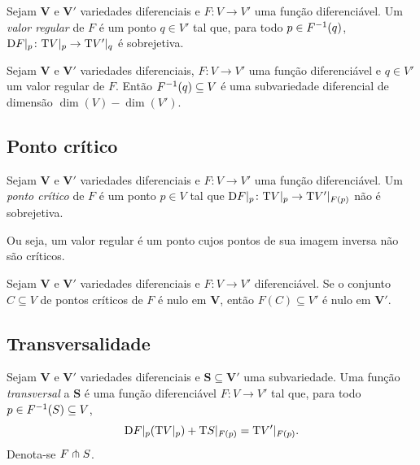 \begin{definition}
Sejam $\bm V$ e $\bm V'$ variedades diferenciais e $F\colon V \to V'$ uma função diferenciável. Um \emph{valor regular} de $F$ é um ponto $q \in V'$ tal que, para todo $p \in F^{-1}(q)$, $\mathrm{D} F|_p\colon \mathrm{T} V|_p \to \mathrm{T} V'|_q$ é  sobrejetiva.
\end{definition}

\begin{proposition}
Sejam $\bm V$ e $\bm V'$ variedades diferenciais, $F\colon V \to V'$ uma função diferenciável e $q \in V'$ um valor regular de $F$. Então $F^{-1}(q) \subseteq V$ é uma subvariedade diferencial de dimensão $\dim(V)-\dim(V')$.
\end{proposition}

\subsection{Ponto crítico}

\begin{definition}
Sejam $\bm V$ e $\bm V'$ variedades diferenciais e $F\colon V \to V'$ uma função diferenciável. Um \emph{ponto crítico} de $F$ é um ponto $p \in V$ tal que $\mathrm{D} F|_p\colon \mathrm{T} V|_p \to \mathrm{T} V'|_{F(p)}$ não é sobrejetiva.
\end{definition}

Ou seja, um valor regular é um ponto cujos pontos de sua imagem inversa não são críticos.

\begin{proposition}
Sejam $\bm V$ e $\bm V'$ variedades diferenciais e $F\colon V \to V'$ diferenciável. Se o conjunto $C \subseteq V$ de pontos críticos de $F$ é nulo em $\bm V$, então $F(C) \subseteq V'$ é nulo em $\bm V'$.
\end{proposition}

\subsection{Transversalidade}

\begin{definition}
Sejam $\bm V$ e $\bm V'$ variedades diferenciais e $\bm S \subseteq \bm V'$ uma subvariedade. Uma função \emph{transversal} a $\bm S$ é uma função diferenciável $F\colon V \to V'$ tal que, para todo $p \in F^{-1}(S) \subseteq V$,
	\begin{equation*}
	\mathrm{D} F|_p(\mathrm{T} V|_p) + \mathrm{T} S|_{F(p)} = \mathrm{T} V'|_{F(p)}.
	\end{equation*}
Denota-se $F \pitchfork S$.
\end{definition}


